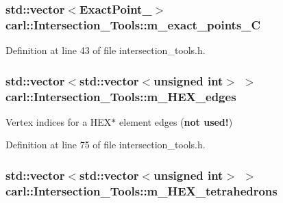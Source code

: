 \subsubsection[{m\+\_\+exact\+\_\+points\+\_\+\+C}]{\setlength{\rightskip}{0pt plus 5cm}std\+::vector$<${\bf Exact\+Point\+\_}$>$ carl\+::\+Intersection\+\_\+\+Tools\+::m\+\_\+exact\+\_\+points\+\_\+\+C\hspace{0.3cm}{\ttfamily [protected]}}\label{classcarl_1_1_intersection___tools_a473d6a254b10623659a1d8f81bbe695f}


Definition at line 43 of file intersection\+\_\+tools.\+h.

\hypertarget{classcarl_1_1_intersection___tools_a418dc03e4edc3f5bba1f78f6fc5afe71}{}
\subsubsection[{m\+\_\+\+H\+E\+X\+\_\+edges}]{\setlength{\rightskip}{0pt plus 5cm}std\+::vector$<$std\+::vector$<$unsigned int$>$ $>$ carl\+::\+Intersection\+\_\+\+Tools\+::m\+\_\+\+H\+E\+X\+\_\+edges\hspace{0.3cm}{\ttfamily [protected]}}\label{classcarl_1_1_intersection___tools_a418dc03e4edc3f5bba1f78f6fc5afe71}


Vertex indices for a H\+E\+X$\ast$ element edges ({\bfseries not used!}) 



Definition at line 75 of file intersection\+\_\+tools.\+h.

\hypertarget{classcarl_1_1_intersection___tools_af74ec1bcb1a896df19642d340dd2762c}{}
\subsubsection[{m\+\_\+\+H\+E\+X\+\_\+tetrahedrons}]{\setlength{\rightskip}{0pt plus 5cm}std\+::vector$<$std\+::vector$<$unsigned int$>$ $>$ carl\+::\+Intersection\+\_\+\+Tools\+::m\+\_\+\+H\+E\+X\+\_\+tetrahedrons\hspace{0.3cm}{\ttfamily [protected]}}\label{classcarl_1_1_intersection___tools_af74ec1bcb1a896df19642d340dd2762c}


